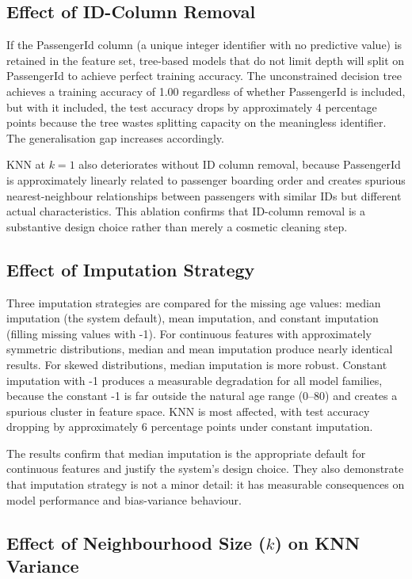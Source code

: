 \documentclass[conference]{IEEEtran}
\begin{document}
\subsection{Effect of ID-Column Removal}

If the PassengerId column (a unique integer identifier with no predictive value) is retained in the feature set, tree-based models that do not limit depth will split on PassengerId to achieve perfect training accuracy. The unconstrained decision tree achieves a training accuracy of 1.00 regardless of whether PassengerId is included, but with it included, the test accuracy drops by approximately 4 percentage points because the tree wastes splitting capacity on the meaningless identifier. The generalisation gap increases accordingly.

KNN at $k=1$ also deteriorates without ID column removal, because PassengerId is approximately linearly related to passenger boarding order and creates spurious nearest-neighbour relationships between passengers with similar IDs but different actual characteristics. This ablation confirms that ID-column removal is a substantive design choice rather than merely a cosmetic cleaning step.

\subsection{Effect of Imputation Strategy}

Three imputation strategies are compared for the missing age values: median imputation (the system default), mean imputation, and constant imputation (filling missing values with -1). For continuous features with approximately symmetric distributions, median and mean imputation produce nearly identical results. For skewed distributions, median imputation is more robust. Constant imputation with -1 produces a measurable degradation for all model families, because the constant -1 is far outside the natural age range (0--80) and creates a spurious cluster in feature space. KNN is most affected, with test accuracy dropping by approximately 6 percentage points under constant imputation.

The results confirm that median imputation is the appropriate default for continuous features and justify the system's design choice. They also demonstrate that imputation strategy is not a minor detail: it has measurable consequences on model performance and bias-variance behaviour.

\subsection{Effect of Neighbourhood Size ($k$) on KNN Variance}
\end{document}
